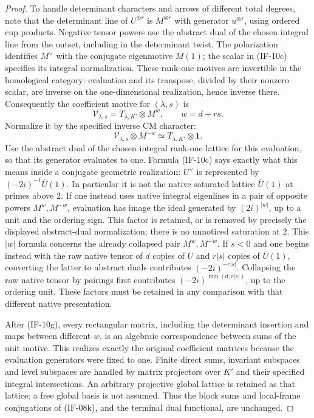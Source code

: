 \documentclass[11pt,a4paper]{article}
\theoremstyle{definition}
\theoremstyle{remark}
\begin{document}
\begin{proof}
To handle determinant characters and arrows of different total
degrees, note that the determinant line of $U^{\oplus r}$ is
$M^{\otimes r}$ with generator $u^{\otimes r}$, using ordered cup
products. Negative tensor powers use the abstract dual of the chosen integral
line from the outset, including in the determinant twist. The polarization
identifies $M^\vee$ with the conjugate eigenmotive $\overline M(1)$;
the scalar in (IF-10c) specifies its integral normalization. These
rank-one motives are invertible in the homological category: evaluation
and its transpose, divided by their nonzero scalar, are inverse on the
one-dimensional realization, hence inverse there. Consequently the
coefficient motive for $(\lambda,s)$ is
\[
 \mathcal V_{\lambda,s}=T_{\lambda,K'}\otimes M^w,
 \qquad w=d+rs.
\]
Normalize it by the specified inverse CM character:
\[
 \mathcal V_{\lambda,s}\otimes M^{-w}
       \simeq T_{\lambda,K'}\otimes\mathbf1.       \tag{IF-10g}
\]
Use the abstract dual of the chosen integral rank-one lattice for this
evaluation, so that its generator evaluates to one. Formula (IF-10c)
says exactly what this means inside a conjugate geometric realization:
$U^\vee$ is represented by
$(-2i)^{-1}\overline U(1)$. In particular it is not the native
saturated lattice $\overline U(1)$ at primes above $2$. If one instead
uses native integral eigenlines in a pair of opposite powers
$M^w,M^{-w}$, evaluation has image the ideal generated by
$(2i)^{|w|}$, up to a unit and the ordering sign. This factor is retained,
or is removed by precisely the displayed abstract-dual normalization;
there is no unnoticed saturation at $2$. This $|w|$ formula concerns
the already collapsed pair $M^w,M^{-w}$. If $s<0$ and one begins
instead with the raw native tensor of $d$ copies of $U$ and
$r|s|$ copies of $\overline U(1)$, converting the latter to abstract
duals contributes $(-2i)^{-r|s|}$. Collapsing the raw native tensor by
pairings first contributes $(-2i)^{\min(d,r|s|)}$, up to the ordering
unit. These factors must be retained in any comparison with that
different native presentation.

After (IF-10g), every rectangular matrix, including the determinant
insertion and maps between different $w$, is an algebraic correspondence
between sums of the unit motive. This realizes exactly the original
coefficient matrices because the evaluation generators were fixed to
one. Finite direct sums, invariant subspaces and level subspaces are
handled by matrix projectors over $K'$ and their specified integral
intersections. An arbitrary projective global lattice is retained as
that lattice; a free global basis is not assumed. Thus the block sums
and local-frame conjugations of (IF-08k), and the terminal dual
functional, are unchanged.


\end{proof}
\end{document}
